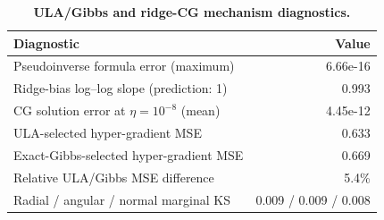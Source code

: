 \begin{table}[t]
  \centering
  \caption{\textbf{ULA/Gibbs and ridge-CG mechanism diagnostics.}}
  \label{tab:synthetic-mechanisms}
  \begin{tabular}{lr}
    \toprule
    Diagnostic & Value \\
    \midrule
    Pseudoinverse formula error (maximum) & 6.66e-16 \\
    Ridge-bias log--log slope (prediction: 1) & 0.993 \\
    CG solution error at $\eta=10^{-8}$ (mean) & 4.45e-12 \\
    ULA-selected hyper-gradient MSE & 0.633 \\
    Exact-Gibbs-selected hyper-gradient MSE & 0.669 \\
    Relative ULA/Gibbs MSE difference & 5.4\% \\
    Radial / angular / normal marginal KS & 0.009 / 0.009 / 0.008 \\
    \bottomrule
  \end{tabular}
\end{table}
